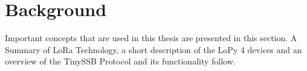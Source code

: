 \chapter{Background}










Important concepts that are used in this thesis are presented in this section. A Summary of LoRa Technology, a short description of the LoPy 4 devices and an overview of the TinySSB Protocol and its functionality follow.
